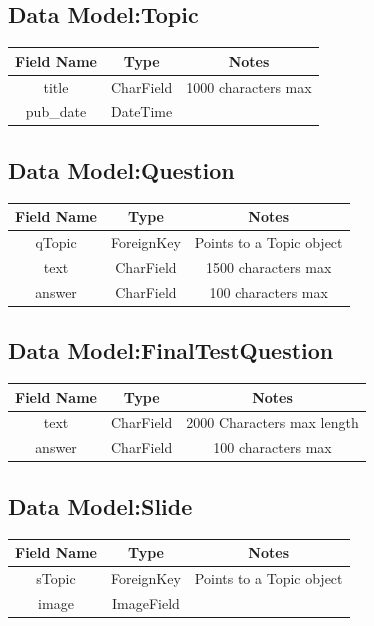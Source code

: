 \documentclass{l3proj}
\begin{document}
\subsection{Data Model:Topic}
\begin{tabular}{|c|c|c|}
\hline \textbf{Field Name} & \textbf{Type} & \textbf{Notes}\\
\hline title & CharField & 1000 characters max \\ 
\hline pub\_date & DateTime & \\ \hline
\end{tabular}
\subsection{Data Model:Question}
\begin{tabular}{|c|c|c|}
\hline \textbf{Field Name} & \textbf{Type} & \textbf{Notes}\\
\hline qTopic & ForeignKey & Points to a Topic object \\ 
\hline text & CharField & 1500 characters max \\
\hline answer & CharField & 100 characters max \\ \hline
\end{tabular}
\subsection{Data Model:FinalTestQuestion}
\begin{tabular}{|c|c|c|}
\hline \textbf{Field Name} & \textbf{Type} & \textbf{Notes}\\
\hline text & CharField & 2000 Characters max length \\ 
\hline answer & CharField & 100 characters max \\ \hline
\end{tabular}
\subsection{Data Model:Slide}
\begin{tabular}{|c|c|c|}
\hline \textbf{Field Name} & \textbf{Type} & \textbf{Notes}\\
\hline sTopic & ForeignKey & Points to a Topic object \\ 
\hline image & ImageField & \\ \hline
\end{tabular}
\end{document}
